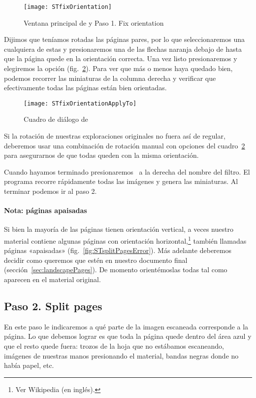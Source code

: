 \documentclass[%
	a5paper,
	10pt,
	twoside,
	openright,
	final,
]{memoir}
\begin{document}
{	\begin{figure}
		\centering
		\texttt{[image: STfixOrientation]}
		\caption[Paso 1. Fix orientation]{Ventana principal de \scantailor y Paso 1. Fix orientation\label{fig:STfixOrientation}}
	\end{figure}

	Dijimos que teníamos rotadas las páginas pares, por lo que seleccionaremos una cualquiera de estas y presionaremos una de las flechas naranja debajo de  hasta que la página quede en la orientación correcta. Una vez listo presionaremos  y elegiremos la opción  (fig.~\ref{fig:STfixOrientationApplyTo}). Para ver que más o menos haya quedado bien, podemos recorrer las miniaturas de la columna derecha y verificar que efectivamente todas las páginas están bien orientadas.

	\begin{figure}
		\centering
		\texttt{[image: STfixOrientationApplyTo]}
		\caption[Cuadro de diálogo \texttt{Apply to\...} de \scantailor]{Cuadro de diálogo  de \scantailor\label{fig:STfixOrientationApplyTo}}
	\end{figure}

	Si la rotación de nuestras exploraciones originales no fuera así de regular, deberemos usar una combinación de rotación manual con opciones del cuadro~\ref{fig:STfixOrientationApplyTo} para asegurarnos de que todas queden con la misma orientación.

	Cuando hayamos terminado presionaremos \play\ a la derecha del nombre del filtro. El programa recorre rápidamente todas las imágenes y genera las miniaturas. Al terminar podemos ir al paso 2.

	\paragraph{Nota: páginas apaisadas} Si bien la mayoría de las páginas tienen orientación vertical, a veces nuestro material contiene algunas páginas con orientación horizontal,\footnote{Ver Wikipedia \cite{WikipediaPageOrientation} (en inglés).} también llamadas páginas «apaisadas» (fig.~\ref{fig:STsplitPagesError}). Más adelante deberemos decidir como queremos que estén en nuestro documento final (sección~\ref{sec:landscapePages}). De momento orientémoslas todas tal como aparecen en el material original.

	\subsection{Paso 2. Split pages\label{sec:STsplitPages}} En este paso le indicaremos a \scantailor qué parte de la imagen escaneada corresponde a la página. Lo que debemos lograr es que toda la página quede dentro del área azul y que el resto quede fuera: trozos de la hoja que no estábamos escaneando, imágenes de nuestras manos presionando el material, bandas negras donde no había papel, etc.

}
\end{document}
